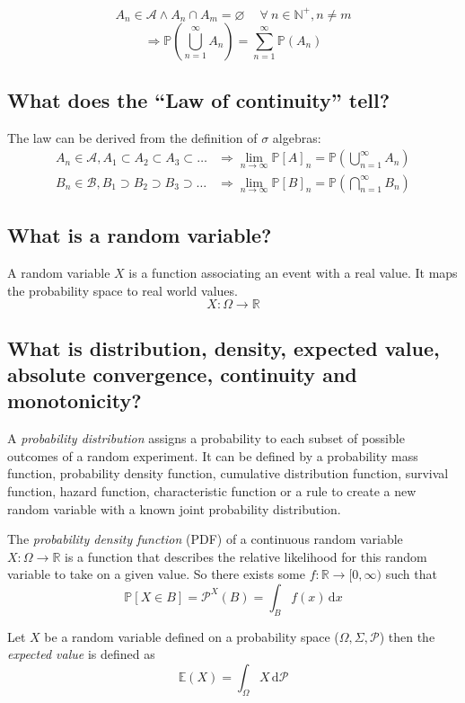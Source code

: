 \documentclass[a4paper]{article}
\newcommand\p{\mathcal{P}}
\newcommand\op[2][P]{\mathbb{#1}\left(#2\right)}
\newcommand\os[2][P]{\mathbb{#1}\left[#2\right]}
\newcommand\fall{\:\forall\:}
\newcommand\dt{\,\text{d}}
\newcommand\key[1]{\textit{#1}}
\theoremstyle{definition}
\begin{document}
\[
  A_n \in \mathcal{A} \land A_n \cap A_m = \varnothing \quad\fall n \in \mathbb{N}^+, n \neq m
\] \[
  \Rightarrow
  \op{\bigcup_{n=1}^\infty A_n} = \sum_{n=1}^\infty \op{A_n}
\]

\subsection{What does the \enquote{Law of continuity} tell?}

The law can be derived from the definition of $\sigma$ algebras:
\begin{align*}
  A_n \in \mathcal{A}, A_1 \subset A_2 \subset A_3 \subset \ldots & \Rightarrow \lim_{n\rightarrow\infty} \os A_n = \op{\bigcup_{n=1}^\infty A_n} \\
  B_n \in \mathcal{B}, B_1 \supset B_2 \supset B_3 \supset \ldots & \Rightarrow \lim_{n\rightarrow\infty} \os B_n = \op{\bigcap_{n=1}^\infty B_n}
\end{align*}

\subsection{What is a random variable?}

A random variable $X$ is a function associating an event with a real value. It maps the probability space to real world values.
\[ X: \Omega \rightarrow \mathbb{R} \]

\subsection{What is distribution, density, expected value, absolute convergence, continuity and monotonicity?}
%
A \key{probability distribution} assigns a probability to each subset of possible outcomes of a random experiment. It can be defined by a probability mass function, probability density function, cumulative distribution function, survival function, hazard function, characteristic function or a rule to create a new random variable with a known joint probability distribution.

The \key{probability density function} (PDF) of a continuous random variable $X: \Omega \rightarrow \mathbb{R}$ is a function that describes the relative likelihood for this random variable to take on a given value. So there exists some $f: \mathbb{R} \rightarrow [0, \infty)$ such that
\[
  \os{X \in B} = \p^X(B) = \int_B f(x) \dt x
\]

Let $X$ be a random variable defined on a probability space ($\Omega, \Sigma, \p$) then the \key{expected value} is defined as
\[
  \mathbb{E}(X) = \int_{\Omega} X \dt \p
\]
\end{document}
